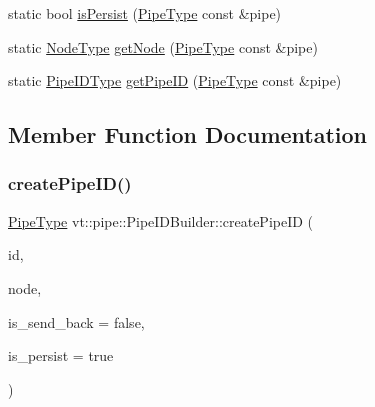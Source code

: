 \begin{DoxyCompactItemize}
\item 
static bool \hyperlink{structvt_1_1pipe_1_1_pipe_i_d_builder_aa41d388099f07c484914bc03be5749d3}{is\+Persist} (\hyperlink{namespacevt_ac9852acda74d1896f48f406cd72c7bd3}{Pipe\+Type} const \&pipe)
\item 
static \hyperlink{namespacevt_a866da9d0efc19c0a1ce79e9e492f47e2}{Node\+Type} \hyperlink{structvt_1_1pipe_1_1_pipe_i_d_builder_a7fb285d1a62b6d7fef4a04a195ce8ffd}{get\+Node} (\hyperlink{namespacevt_ac9852acda74d1896f48f406cd72c7bd3}{Pipe\+Type} const \&pipe)
\item 
static \hyperlink{namespacevt_1_1pipe_a8aa7908de242917ac0922b9e9c85fea4}{Pipe\+I\+D\+Type} \hyperlink{structvt_1_1pipe_1_1_pipe_i_d_builder_ac02b448be5ebc3545ae961e16263b78e}{get\+Pipe\+ID} (\hyperlink{namespacevt_ac9852acda74d1896f48f406cd72c7bd3}{Pipe\+Type} const \&pipe)
\end{DoxyCompactItemize}


\subsection{Member Function Documentation}
\mbox{\label{structvt_1_1pipe_1_1_pipe_i_d_builder_acb826a923e3af487c922d1263375d00d}} 
\subsubsection{\texorpdfstring{create\+Pipe\+I\+D()}{createPipeID()}}
{\footnotesize\ttfamily \hyperlink{namespacevt_ac9852acda74d1896f48f406cd72c7bd3}{Pipe\+Type} vt\+::pipe\+::\+Pipe\+I\+D\+Builder\+::create\+Pipe\+ID (\begin{DoxyParamCaption}\item[{\hyperlink{namespacevt_1_1pipe_a8aa7908de242917ac0922b9e9c85fea4}{Pipe\+I\+D\+Type} const \&}]{id,  }\item[{\hyperlink{namespacevt_a866da9d0efc19c0a1ce79e9e492f47e2}{Node\+Type} const \&}]{node,  }\item[{bool const \&}]{is\+\_\+send\+\_\+back = {\ttfamily false},  }\item[{bool const \&}]{is\+\_\+persist = {\ttfamily true} }\end{DoxyParamCaption})\hspace{0.3cm}{\ttfamily [static]}}

